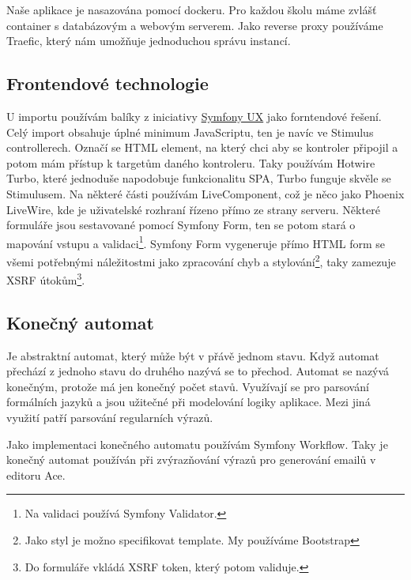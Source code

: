 Naše aplikace je nasazována pomocí dockeru. Pro každou školu máme zvlášť container s databázovým a webovým serverem.
Jako reverse proxy používáme Traefic, který nám umožňuje jednoduchou správu instancí.

\subsection{Frontendové technologie}

U importu používám balíky z iniciativy \href{https://ux.symfony.com/}{Symfony UX} jako forntendové řešení.
Celý import obsahuje úplné minimum JavaScriptu, ten je navíc ve Stimulus controllerech. Označí se HTML element, na který chci aby se kontroler připojil a potom mám přístup k targetům daného kontroleru.
Taky používám Hotwire Turbo\label{ux-turbo}, které jednoduše napodobuje funkcionalitu SPA, Turbo funguje skvěle se Stimulusem.
Na některé části používám LiveComponent, což je něco jako Phoenix LiveWire, kde je uživatelské rozhraní řízeno přímo ze strany serveru. 
Některé formuláře jsou sestavované pomocí Symfony Form, ten se potom stará o mapování vstupu a validaci\footnote{Na validaci používá Symfony Validator.}.
Symfony Form vygeneruje přímo HTML form se všemi potřebnými náležitostmi jako zpracování chyb a stylování\footnote{Jako styl je možno specifikovat template. My používáme Bootstrap}, taky zamezuje XSRF útokům\footnote{Do formuláře vkládá XSRF token, který potom validuje.}.

  \subsection{Konečný automat}\label{uvod:konecny-automat}

Je abstraktní automat, který může být v přávě jednom stavu.\cite{wiki:finite-state-machine-en} Když automat přechází z jednoho stavu do druhého nazývá se to přechod.
Automat se nazývá konečným, protože má jen konečný počet stavů.
Využívají se pro parsování formálních jazyků a jsou užitečné při modelování logiky aplikace.
Mezi jiná využití patří parsování regularních výrazů.\cite{wiki:finite-state-machine-cz}

Jako implementaci konečného automatu používám Symfony Workflow.
Taky je konečný automat používán při zvýrazňování výrazů pro generování emailů v editoru Ace.


